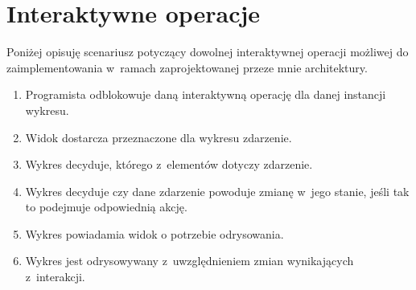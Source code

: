 \section{Interaktywne operacje}
Poniżej opisuję scenariusz potyczący dowolnej interaktywnej operacji możliwej do zaimplementowania w~ramach zaprojektowanej przeze mnie architektury.

\begin{enumerate}
\item{Programista odblokowuje daną interaktywną operację dla danej instancji wykresu.}
\item{Widok dostarcza przeznaczone dla wykresu zdarzenie.}
\item{Wykres decyduje, którego z~elementów dotyczy zdarzenie.}
\item{Wykres decyduje czy dane zdarzenie powoduje zmianę w~jego stanie, jeśli tak to podejmuje odpowiednią akcję.}
\item{Wykres powiadamia widok o potrzebie odrysowania.}
\item{Wykres jest odrysowywany z~uwzględnieniem zmian wynikających z~interakcji.}
\end{enumerate}








